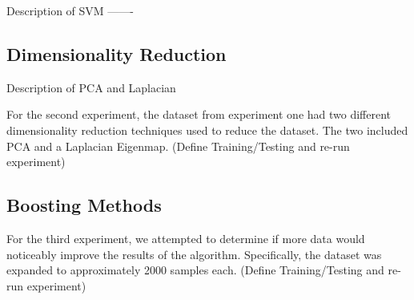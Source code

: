 Description of SVM -------



\subsection{Dimensionality Reduction}

Description of PCA and Laplacian


For the second experiment, the dataset from experiment one had two different dimensionality reduction techniques used to reduce the dataset.  The two included PCA and a Laplacian Eigenmap.  (Define Training/Testing and re-run experiment)
\subsection{Boosting Methods}
For the third experiment, we attempted to determine if more data would noticeably improve the results of the algorithm.  Specifically, the dataset was expanded to approximately 2000 samples each. (Define Training/Testing and re-run experiment)